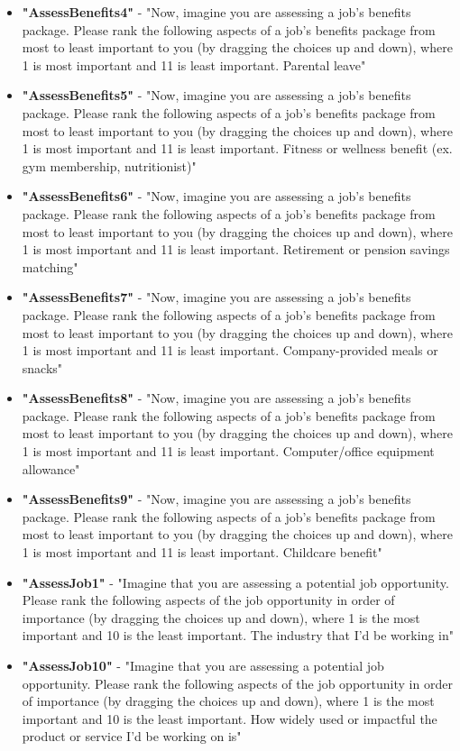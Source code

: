 \begin{appendices}
\begin{itemize}
        \item \textbf{"AssessBenefits4"} - "Now, imagine you are assessing a job's benefits package. Please rank the following aspects of a job's benefits package from most to least important to you (by dragging the choices up and down), where 1 is most important and 11 is least important. Parental leave"
        \item \textbf{"AssessBenefits5"} - "Now, imagine you are assessing a job's benefits package. Please rank the following aspects of a job's benefits package from most to least important to you (by dragging the choices up and down), where 1 is most important and 11 is least important. Fitness or wellness benefit (ex. gym membership, nutritionist)"
        \item \textbf{"AssessBenefits6"} - "Now, imagine you are assessing a job's benefits package. Please rank the following aspects of a job's benefits package from most to least important to you (by dragging the choices up and down), where 1 is most important and 11 is least important. Retirement or pension savings matching"
        \item \textbf{"AssessBenefits7"} - "Now, imagine you are assessing a job's benefits package. Please rank the following aspects of a job's benefits package from most to least important to you (by dragging the choices up and down), where 1 is most important and 11 is least important. Company-provided meals or snacks"
        \item \textbf{"AssessBenefits8"} - "Now, imagine you are assessing a job's benefits package. Please rank the following aspects of a job's benefits package from most to least important to you (by dragging the choices up and down), where 1 is most important and 11 is least important. Computer/office equipment allowance"
        \item \textbf{"AssessBenefits9"} - "Now, imagine you are assessing a job's benefits package. Please rank the following aspects of a job's benefits package from most to least important to you (by dragging the choices up and down), where 1 is most important and 11 is least important. Childcare benefit"
        \item \textbf{"AssessJob1"} - "Imagine that you are assessing a potential job opportunity. Please rank the following aspects of the job opportunity in order of importance (by dragging the choices up and down), where 1 is the most important and 10 is the least important. The industry that I'd be working in"
        \item \textbf{"AssessJob10"} - "Imagine that you are assessing a potential job opportunity. Please rank the following aspects of the job opportunity in order of importance (by dragging the choices up and down), where 1 is the most important and 10 is the least important. How widely used or impactful the product or service I'd be working on is"

\end{itemize}
\end{appendices}
